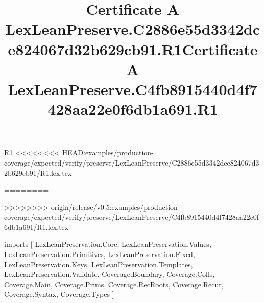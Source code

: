 \begin{lexlean}{R1}
<<<<<<<< HEAD:examples/production-coverage/expected/verify/preserve/LexLeanPreserve/C2886e55d3342dce824067d32b629cb91/R1.lex.tex
\title{Certificate A LexLeanPreserve.C2886e55d3342dce824067d32b629cb91.R1}
========
\title{Certificate A LexLeanPreserve.C4fb8915440d4f7428aa22e0f6db1a691.R1}
>>>>>>>> origin/release/v0.5:examples/production-coverage/expected/verify/preserve/LexLeanPreserve/C4fb8915440d4f7428aa22e0f6db1a691/R1.lex.tex
\begin{coremodule}
imports [
  LexLeanPreservation.Core,
  LexLeanPreservation.Values,
  LexLeanPreservation.Primitives,
  LexLeanPreservation.Fixed,
  LexLeanPreservation.Keys,
  LexLeanPreservation.Templates,
  LexLeanPreservation.Validate,
  Coverage.Boundary,
  Coverage.Colls,
  Coverage.Main,
  Coverage.Prims,
  Coverage.RecRoots,
  Coverage.Recur,
  Coverage.Syntax,
  Coverage.Types
]


\end{coremodule}
\end{lexlean}
